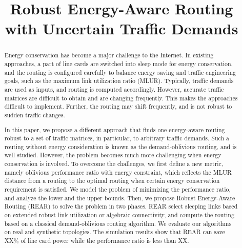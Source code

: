 \documentclass[conference]{IEEEtran}
\begin{document}
\title{Robust Energy-Aware Routing with Uncertain Traffic Demands}


\author{
\and
{}
\and
{}
}


\maketitle

\begin{abstract}
Energy conservation has become a major challenge to the Internet. In existing approaches, a part of line cards 
are switched into sleep mode for energy conservation, and the routing is configured carefully to balance energy saving 
and traffic engineering goals, such as the maximum link utilization ratio (MLUR). Typically, traffic demands are 
used as inputs, and routing is computed accordingly. However, accurate traffic matrices are difficult to obtain and 
are changing frequently. This makes the approaches difficult to implement. Further, the routing may shift 
frequently, and is not robust to sudden traffic changes.

In this paper, we propose a different approach that finds one energy-aware routing robust to a set of traffic 
matrices, in particular, to arbitrary traffic demands. Such a routing without energy consideration is known as 
the demand-oblivious routing, and is well studied. However, the problem becomes much more challenging when energy 
conservation is involved. To overcome the challenges, we first define a new metric, namely oblivious performance 
ratio with energy constraint, which reflects the MLUR distance from a routing to the optimal routing when 
certain energy conservation requirement is satisfied. We model the problem of minimizing the performance ratio, 
and analyze the lower and the upper bounds. Then, we propose Robust Energy-Aware Routing (REAR) to solve 
the problem in two phases. REAR select sleeping links based on extended robust link utilization or algebraic 
connectivity, and compute the routing based on a classical demand-oblivious routing algorithm. 
We evaluate our algorithms on real and synthetic topologies. The simulation results show that REAR can save 
XX\% of line card power while the performance ratio is less than XX.
\end{abstract}
\end{document}
